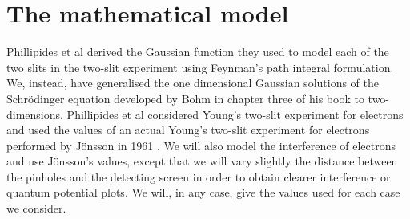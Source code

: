 \documentclass[12pt]{article}       %
\begin{document}
\section{The mathematical model\label{MM}}
Phillipides et al \cite{DEWD79} derived the Gaussian function they used to model each of the two slits in the two-slit experiment using Feynman's path integral formulation. We, instead, have generalised the one dimensional Gaussian solutions of the Schr\"{o}dinger equation developed by Bohm in chapter three of his book \cite{B51} to two-dimensions. Phillipides et al \cite{DEWD79} considered Young's two-slit experiment for electrons and used the values of an actual  Young's two-slit experiment for electrons performed by J\"{o}nsson in 1961 \cite{jon61}. We will also model the interference of electrons and use  J\"{o}nsson's values, except that we will vary slightly the distance between the pinholes and the detecting screen in order to obtain clearer interference or quantum potential plots. We will, in any case,  give the values used for each case we consider. 
\end{document}
